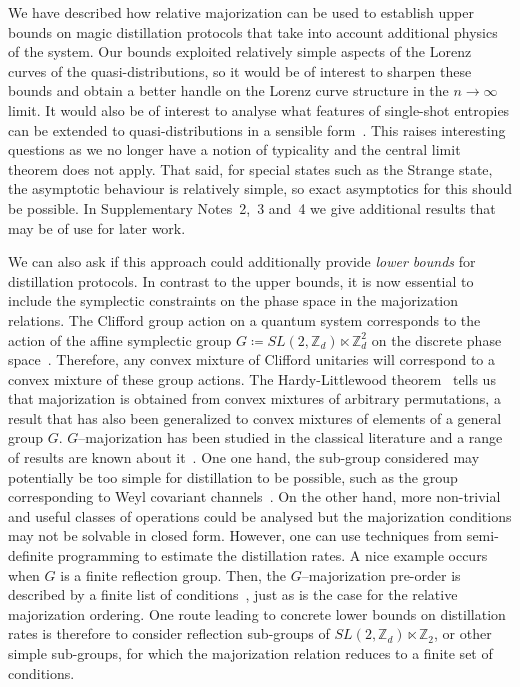 \documentclass[
onecolumn,
superscriptaddress
]{revtex4-1}
\newcommand{\revhigh}[1]{{\color{red}#1}}
\begin{document}
We have described how relative majorization can be used to establish upper bounds on magic distillation protocols that take into account additional physics of the system. Our bounds exploited relatively simple aspects of the Lorenz curves of the quasi-distributions, so it would be of interest to sharpen these bounds and obtain a better handle on the Lorenz curve structure in the $n\rightarrow \infty$ limit. It would also be of interest to analyse what features of single-shot entropies can be extended to quasi-distributions in a sensible form~\cite{renner_phd, tomamichel2013}. This raises interesting questions as we no longer have a notion of typicality and the central limit theorem does not apply. That said, for special states such as the Strange state, the asymptotic behaviour is relatively simple, so exact asymptotics for this should be possible. In Supplementary Notes~2,~3 and~4 we give additional results that may be of use for later work.

We can also ask if this approach could additionally provide \emph{lower bounds} for distillation protocols. In contrast to the upper bounds, it is now essential to include the symplectic constraints on the phase space in the majorization relations. The Clifford group action on a quantum system corresponds to the action of the affine symplectic group $G \coloneqq SL(2,\mathbb{Z}_d) \ltimes \mathbb{Z}_d^2$ on the discrete phase space~\cite{Appleby_2005, Bengtsson_2006}. Therefore, any convex mixture of Clifford unitaries will correspond to a convex mixture of these group actions. The Hardy-Littlewood theorem~\cite{hardy_1952} tells us that majorization is obtained from convex mixtures of arbitrary permutations, a result that has also been generalized to convex mixtures of elements of a general group $G$. $G$--majorization has been studied in the classical literature and a range of results are known about it~\cite{giovagnoli_1985, steerneman_1990, giovagnoli_cyclic_1996, eaton_1977}. 
\revhigh{One one hand, the sub-group considered may potentially be too simple for distillation to be possible, such as the group corresponding to Weyl covariant channels~\cite{fukuda2006}.
On the other hand, more non-trivial and useful classes of operations could be analysed but the majorization conditions may not be solvable in closed form.
However, one can use techniques from semi-definite programming to estimate the distillation rates.
A nice example occurs when $G$ is a finite reflection group. Then, the $G$--majorization pre-order is described by a finite list of conditions~\cite{giovagnoli_1985}, just as is the case for the relative majorization ordering.}
One route leading to concrete lower bounds on distillation rates is therefore to consider reflection sub-groups of $SL(2,\mathbb{Z}_d) \ltimes \mathbb{Z}_2$, or other simple sub-groups, for which the majorization relation reduces to a finite set of conditions.
  
\end{document}
